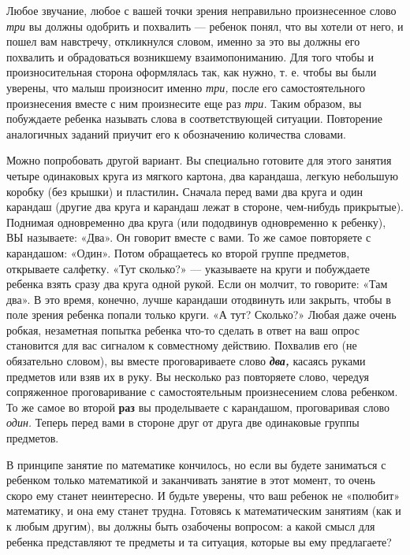 \documentclass{book}
\renewcommand{\emph}[1]{\textit{#1}}
\begin{document}
Любое звучание, любое с вашей точки зрения неправильно произнесенное
слово \emph{три} вы должны одобрить и похвалить --- ребенок понял, что
вы хотели от него, и пошел вам навстречу, откликнулся словом, именно за
это вы должны его похвалить и обрадоваться возникшему взаимопониманию.
Для того чтобы и произносительная сторона оформлялась так, как нужно, т.
е. чтобы вы были уверены, что малыш произносит именно \emph{три,} после
его самостоятельного произнесения вместе с ним произнесите еще раз
\emph{три.} Таким образом, вы побуждаете ребенка называть слова в
соответствующей ситуации. Повторение аналогичных заданий приучит его к
обозначению количества словами.

Можно попробовать другой вариант. Вы специально готовите для этого
занятия четыре одинаковых круга из мягкого картона, два карандаша,
легкую небольшую коробку (без крышки) и пластилин\textbf{.} Сначала
перед вами два круга и один карандаш (другие два круга и карандаш лежат
в стороне, чем-нибудь прикрытые). Поднимая одновременно два круга (или
пододвинув одновременно к ребенку), ВЫ называете: «Два». Он говорит
вместе с вами. То же самое повторяете с карандашом: «Один». Потом
обращаетесь ко второй группе предметов, открываете салфетку. «Тут
сколько?» --- указываете на круги и побуждаете ребенка взять сразу два
круга одной рукой. Если он молчит, то говорите: «Там два». В это время,
конечно, лучше карандаши отодвинуть или закрыть, чтобы в поле зрения
ребенка попали только круги. «А тут? Сколько?» Любая даже очень робкая,
незаметная попытка ребенка что-то сделать в ответ на ваш опрос
становится для вас сигналом к совместному действию. Похвалив его (не
обязательно словом), вы вместе проговариваете слово \emph{\textbf{два,}}
касаясь руками предметов или взяв их в руку. Вы несколько раз повторяете
слово, чередуя сопряженное проговаривание с самостоятельным
произнесением слова ребенком. То же самое во второй \textbf{раз} вы
проделываете с карандашом, проговаривая слово \emph{один.} Теперь перед
вами в стороне друг от друга две одинаковые группы предметов.

В принципе занятие по математике кончилось, но если вы будете заниматься
с ребенком только математикой и заканчивать занятие в этот момент, то
очень скоро ему станет неинтересно. И будьте уверены, что ваш ребенок не
«полюбит» математику, и она ему станет трудна. Готовясь к математическим
занятиям (как и к любым другим), вы должны быть озабочены вопросом: а
какой смысл для ребенка представляют те предметы и та ситуация, которые
вы ему предлагаете?
\end{document}

